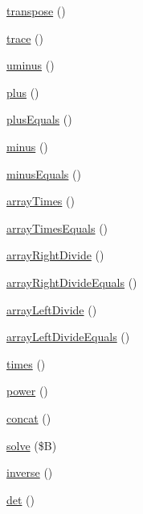 \begin{DoxyCompactItemize}
\item 
\hyperlink{classPHPExcel__Shared__JAMA__Matrix_a44419497014c3530eb93f616842a1725}{transpose} ()
\item 
\hyperlink{classPHPExcel__Shared__JAMA__Matrix_a81a6a4d8c36abe7e5c807347f5f9db27}{trace} ()
\item 
\hyperlink{classPHPExcel__Shared__JAMA__Matrix_a687099a049e1ce9f5e73ab5fe4a66ba5}{uminus} ()
\item 
\hyperlink{classPHPExcel__Shared__JAMA__Matrix_ab7654d8d1d21d7a1b0ed52359959d3f9}{plus} ()
\item 
\hyperlink{classPHPExcel__Shared__JAMA__Matrix_a7a6b8712375ee2fa085099b377351dab}{plus\+Equals} ()
\item 
\hyperlink{classPHPExcel__Shared__JAMA__Matrix_a30fe2af4d69fc74e04d8edfc182d2384}{minus} ()
\item 
\hyperlink{classPHPExcel__Shared__JAMA__Matrix_af8dacf5397401ef98d3c3decf7809508}{minus\+Equals} ()
\item 
\hyperlink{classPHPExcel__Shared__JAMA__Matrix_aac2b8dd00cd0bace6b418b0ae69bd2f6}{array\+Times} ()
\item 
\hyperlink{classPHPExcel__Shared__JAMA__Matrix_a9b9a1859aeac6e683d481706cffd9410}{array\+Times\+Equals} ()
\item 
\hyperlink{classPHPExcel__Shared__JAMA__Matrix_a5a2decfb42aab022b779737bb240ab58}{array\+Right\+Divide} ()
\item 
\hyperlink{classPHPExcel__Shared__JAMA__Matrix_ac569fbbb456cf13a9a5a4c4c0ec8aa32}{array\+Right\+Divide\+Equals} ()
\item 
\hyperlink{classPHPExcel__Shared__JAMA__Matrix_a4aabd3895a9193c8bd5f1b1c8dd91c9f}{array\+Left\+Divide} ()
\item 
\hyperlink{classPHPExcel__Shared__JAMA__Matrix_aa10fd406707e2903d46f28375f4841bd}{array\+Left\+Divide\+Equals} ()
\item 
\hyperlink{classPHPExcel__Shared__JAMA__Matrix_a3f7420016614b7ed6ac73c172a5c50ec}{times} ()
\item 
\hyperlink{classPHPExcel__Shared__JAMA__Matrix_a12159c8d79c9db54a3404feb86866dc0}{power} ()
\item 
\hyperlink{classPHPExcel__Shared__JAMA__Matrix_a958fae736b507fbaf55625d998229fff}{concat} ()
\item 
\hyperlink{classPHPExcel__Shared__JAMA__Matrix_a6d06c241e52a1888aa0013469c7d613d}{solve} (\$B)
\item 
\hyperlink{classPHPExcel__Shared__JAMA__Matrix_a0bbf71e5f923825deb81767787babbc0}{inverse} ()
\item 
\hyperlink{classPHPExcel__Shared__JAMA__Matrix_adceef7c6708da7d5cb634dbc76bb0cc1}{det} ()
\end{DoxyCompactItemize}


